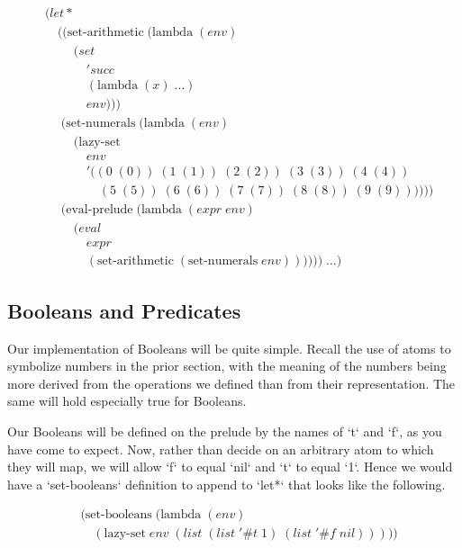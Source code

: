 \begin{align*}
& (let* \; 
\\& \quad ((\text{set-arithmetic} \; (\text{lambda} \; (env)
\\& \qquad \; (set
\\& \qquad \quad \; 'succ
\\& \qquad \quad \; (\text{lambda} \; (x) \; \dots)
\\& \qquad \quad \; env)))
\\& \quad \; (\text{set-numerals} \; (\text{lambda} \; (env) \; 
\\& \qquad \; (\text{lazy-set} \; 
\\& \qquad \quad \; env \; 
\\& \qquad \quad \; '((0 \; (0)) \; (1 \; (1)) \; (2 \; (2)) \; (3 \; (3)) \; (4 \; (4)) \; 
\\& \qquad \qquad \; (5 \; (5)) \; (6 \; (6)) \; (7 \; (7)) \; (8 \; (8)) \; (9 \; (9))))))
\\& \quad \; (\text{eval-prelude} \; (\text{lambda} \; (expr \; env)
\\& \qquad \; (eval \; 
\\& \qquad \quad \; expr
\\& \qquad \quad \; (\text{set-arithmetic} \; (\text{set-numerals} \; env)))))) \; \dots)
\end{align*}

\subsection{Booleans and Predicates}
Our implementation of Booleans will be quite simple. Recall the use of atoms 
to symbolize numbers in the prior section, with the meaning of the numbers 
being more derived from the operations we defined than from their 
representation. The same will hold especially true for Booleans.

Our Booleans will be defined on the prelude by the names of `t` and `f`, as 
you have come to expect. Now, rather than decide on an arbitrary atom to 
which they will map, we will allow `f` to equal `nil` and `t` to equal `1`. 
Hence we would have a `set-booleans` definition to append to `let*` that 
looks like the following.

\begin{align*}
& (\text{set-booleans} \; (\text{lambda} \; (env)
\\& \quad (\text{lazy-set} \; env \; (list \; (list \; '\#t \; 1) \; (list \; '\#f \; nil)))))
\end{align*}


